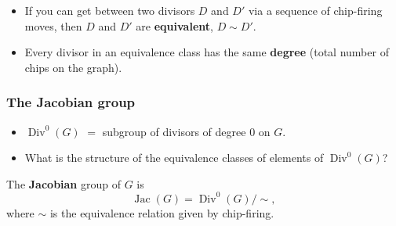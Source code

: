 \documentclass[mathserif, serif, xcolor=dvipsnames]{beamer}
\DeclareMathOperator{\Jac}{Jac}
\DeclareMathOperator{\Div}{Div}
\begin{document}
\begin{frame}
\begin{center}
\begin{tikzpicture}
\end{tikzpicture}
\end{center}

\begin{itemize}

\item
If you can get between two divisors $D$ and $D'$ via a sequence of
chip-firing moves, then $D$ and $D'$ are \textbf{equivalent}, $D\sim D'$.

\pause
\item
Every divisor in an equivalence class has the same
  \textbf{degree} (total number of chips on the graph).

\end{itemize}

\end{frame}

\begin{frame}
  \frametitle{The Jacobian group}
  \begin{itemize}
  \item $\Div^0(G)$ $=$ subgroup of divisors of degree $0$
    on $G$.
    \pause
  \item What is the structure of the equivalence classes of elements of $\Div^0(G)$?
  \end{itemize}
  \pause
  \begin{definition}
    The \textbf{Jacobian} group of $G$ is
    \begin{equation*}
      \Jac(G) = \Div^0(G)/\sim,
    \end{equation*}
    where $\sim$ is the equivalence relation given by chip-firing.
  \end{definition}
\end{frame}
\end{document}
